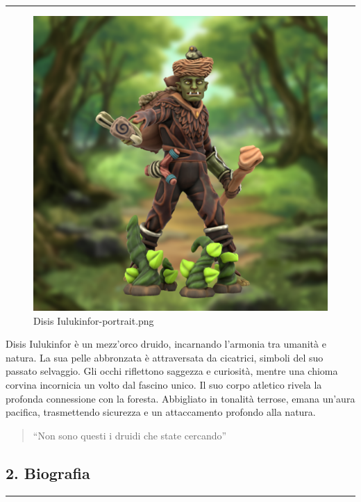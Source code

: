 \begin{center}\rule{0.5\linewidth}{0.5pt}\end{center}

\begin{figure}
\centering
\includegraphics{Disis_Iulukinfor-portrait.png}
\caption{Disis Iulukinfor-portrait.png}
\end{figure}

Disis Iulukinfor è un mezz'orco druido, incarnando l'armonia tra umanità
e natura. La sua pelle abbronzata è attraversata da cicatrici, simboli
del suo passato selvaggio. Gli occhi riflettono saggezza e curiosità,
mentre una chioma corvina incornicia un volto dal fascino unico. Il suo
corpo atletico rivela la profonda connessione con la foresta. Abbigliato
in tonalità terrose, emana un'aura pacifica, trasmettendo sicurezza e un
attaccamento profondo alla natura.

\begin{quote}
``Non sono questi i druidi che state cercando''
\end{quote}

\subsection{2. Biografia}\label{biografia}

\begin{center}\rule{0.5\linewidth}{0.5pt}\end{center}

